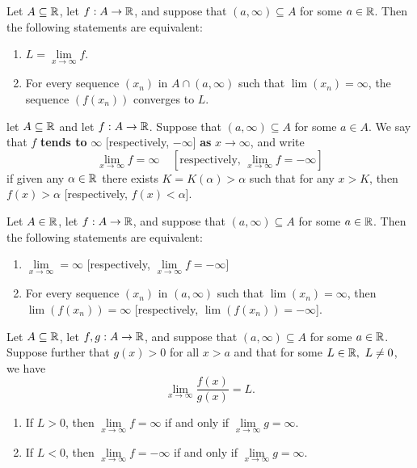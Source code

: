 \begin{theorem}
	Let $A \subseteq \mathbb{R}$, let $f:A \rightarrow \mathbb{R}$, and suppose that $(a,\infty) \subseteq A$ for some $ a \in \mathbb{R}$. Then the following statements are equivalent:
	\begin{enumerate}
		\item $L=\lim\limits_{x\to \infty} f$.
		\item For every sequence $(x_n)$ in $A \cap (a, \infty)$ such that $\lim (x_n) = \infty$, the sequence $(f(x_n))$ converges to $L$.
	\end{enumerate}
\end{theorem}

\begin{definition}
	let $A \subseteq \mathbb{R}$ and let $f: A \rightarrow \mathbb{R}$. Suppose that $(a,\infty)\subseteq A$ for some $a \in A$. We say that $f$ \textbf{tends to} $\infty$ [respectively, $ - \infty$] \textbf{as} $x \rightarrow \infty$, and write
	\[\lim\limits_{x\to \infty} f = \infty \ \ \ \ \ \left[\text{respectively, } \lim\limits_{x\to \infty} f = - \infty \right]\]
	if given any $\alpha \in \mathbb{R}$ there exists $K = K(\alpha)>\alpha$ such that for any $x > K$, then $f(x)>\alpha$ [respectively, $f(x) < \alpha$].
\end{definition}

\begin{theorem}
	Let $A \in \mathbb{R}$, let $f:A \rightarrow \mathbb{R}$, and suppose that $(a, \infty) \subseteq A$ for some $a \in \mathbb{R}$. Then the following statements are equivalent:
	\begin{enumerate}
		\item $\lim\limits_{x\to \infty} = \infty$ [respectively, $\lim\limits_{x\to \infty} f = - \infty$]

		\item For every sequence $(x_n)$ in $(a, \infty)$ such that $\lim (x_n) = \infty$, then $\lim (f(x_n)) = \infty$ [respectively, $\lim (f(x_n)) = - \infty$].
	\end{enumerate}
\end{theorem}

\begin{theorem}
	Let $A \subseteq \mathbb{R}$, let $f,g:A \rightarrow \mathbb{R}$, and suppose that $(a,\infty) \subseteq A$ for some $a \in \mathbb{R}$. Suppose further that $g(x) > 0$ for all $x > a$ and that for some $L \in \mathbb{R},\ L \neq 0$, we have
	\[\lim\limits_{x\to \infty} \frac{f(x)}{g(x)} = L.\]
	\begin{enumerate}
		\item If $L > 0$, then $ \lim\limits_{x\to \infty} f = \infty$ if and only if $\lim\limits_{x\to \infty} g = \infty$.

		\item If $L < 0$, then $\lim\limits_{x\to \infty} f = -\infty$ if and only if $\lim\limits_{x\to \infty} g = \infty$.
	\end{enumerate}
\end{theorem}
